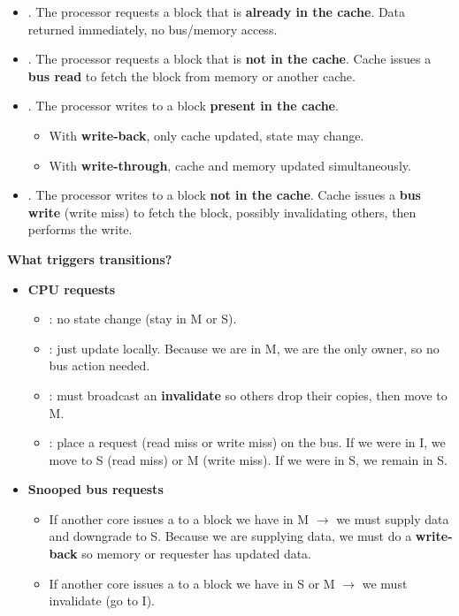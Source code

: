 \begin{remarkbox}
    \begin{itemize}
        \item {}. The processor requests a block that is \textbf{already in the cache}. Data returned immediately, no bus/memory access.
        \item {}. The processor requests a block that is \textbf{not in the cache}. Cache issues a \textbf{bus read} to fetch the block from memory or another cache.
        \item {}. The processor writes to a block \textbf{present in the cache}.
        \begin{itemize}
            \item With \textbf{write-back}, only cache updated, state may change.
            \item With \textbf{write-through}, cache and memory updated simultaneously.
        \end{itemize}
        \item {}. The processor writes to a block \textbf{not in the cache}. Cache issues a \textbf{bus write} (write miss) to fetch the block, possibly invalidating others, then performs the write.
    \end{itemize}
\end{remarkbox}

\begin{flushleft}
    \textcolor{Green3}{ \textbf{What triggers transitions?}}
\end{flushleft}
\begin{itemize}
    \item \textbf{CPU requests}
    \begin{itemize}
        \item {}: no state change (stay in M or S).
        \item {}: just update locally. Because we are in M, we are the only owner, so no bus action needed.
        \item {}: must broadcast an \textbf{invalidate} so others drop their copies, then move to M.
        \item {}: place a request (read miss or write miss) on the bus. If we were in I, we move to S (read miss) or M (write miss). If we were in S, we remain in S.
    \end{itemize}
    \item \textbf{Snooped bus requests}
    \begin{itemize}
        \item If another core issues a  to a block we have in M $\to$ we must supply data and downgrade to S. Because we are supplying data, we must do a \textbf{write-back} so memory or requester has updated data.
        \item If another core issues a  to a block we have in S or M $\to$ we must invalidate (go to I).
    \end{itemize}
\end{itemize}

